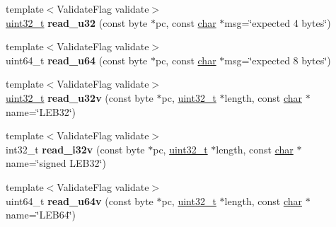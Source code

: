 \begin{DoxyCompactItemize}
\item 
\mbox{\label{classv8_1_1internal_1_1wasm_1_1Decoder_a05458bcf9053882112ad17ae57ab4c9d}} 
{\footnotesize template$<$Validate\+Flag validate$>$ }\\\mbox{\hyperlink{classuint32__t}{uint32\+\_\+t}} {\bfseries read\+\_\+u32} (const byte $\ast$pc, const \mbox{\hyperlink{classchar}{char}} $\ast$msg=\char`\"{}expected 4 bytes\char`\"{})
\item 
\mbox{\label{classv8_1_1internal_1_1wasm_1_1Decoder_a8572d4f545e6106bbf585a3e5e7e4b20}} 
{\footnotesize template$<$Validate\+Flag validate$>$ }\\uint64\+\_\+t {\bfseries read\+\_\+u64} (const byte $\ast$pc, const \mbox{\hyperlink{classchar}{char}} $\ast$msg=\char`\"{}expected 8 bytes\char`\"{})
\item 
\mbox{\label{classv8_1_1internal_1_1wasm_1_1Decoder_a652c71d7e3f8354a4f9cd5ce4e689fe1}} 
{\footnotesize template$<$Validate\+Flag validate$>$ }\\\mbox{\hyperlink{classuint32__t}{uint32\+\_\+t}} {\bfseries read\+\_\+u32v} (const byte $\ast$pc, \mbox{\hyperlink{classuint32__t}{uint32\+\_\+t}} $\ast$length, const \mbox{\hyperlink{classchar}{char}} $\ast$name=\char`\"{}L\+E\+B32\char`\"{})
\item 
\mbox{\label{classv8_1_1internal_1_1wasm_1_1Decoder_a82692d0d213eb43fd49ddb84aa3e6c4b}} 
{\footnotesize template$<$Validate\+Flag validate$>$ }\\int32\+\_\+t {\bfseries read\+\_\+i32v} (const byte $\ast$pc, \mbox{\hyperlink{classuint32__t}{uint32\+\_\+t}} $\ast$length, const \mbox{\hyperlink{classchar}{char}} $\ast$name=\char`\"{}signed L\+E\+B32\char`\"{})
\item 
\mbox{\label{classv8_1_1internal_1_1wasm_1_1Decoder_a705aba692166c6374d588ebf9992caab}} 
{\footnotesize template$<$Validate\+Flag validate$>$ }\\uint64\+\_\+t {\bfseries read\+\_\+u64v} (const byte $\ast$pc, \mbox{\hyperlink{classuint32__t}{uint32\+\_\+t}} $\ast$length, const \mbox{\hyperlink{classchar}{char}} $\ast$name=\char`\"{}L\+E\+B64\char`\"{})
\item 

\end{DoxyCompactItemize}
